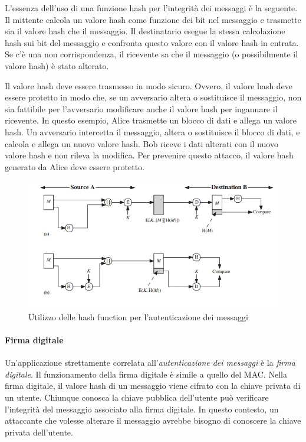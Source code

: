 \documentclass{article}
\theoremstyle{definition}
\begin{document}
L'essenza dell'uso di una funzione hash per l'integrità dei messaggi è la seguente. Il mittente calcola un valore hash come funzione dei bit nel messaggio e trasmette sia il valore hash che il messaggio. Il destinatario esegue la stessa calcolazione hash sui bit del messaggio e confronta questo valore con il valore hash in entrata. Se c'è una non corrispondenza, il ricevente sa che il messaggio (o possibilmente il valore hash) è stato alterato.

Il valore hash deve essere trasmesso in modo sicuro. Ovvero, il valore hash deve essere protetto in modo che, se un avversario altera o sostituisce il messaggio, non sia fattibile per l'avversario modificare anche il valore hash per ingannare il ricevente. In questo esempio, Alice trasmette un blocco di dati e allega un valore hash. Un avversario intercetta il messaggio, altera o sostituisce il blocco di dati, e calcola e allega un nuovo valore hash. Bob riceve i dati alterati con il nuovo valore hash e non rileva la modifica. Per prevenire questo attacco, il valore hash generato da Alice deve essere protetto.

\begin{figure}[H]
    \centering
    \includegraphics[width=\textwidth]{img/alice.jpg}
    \caption{Utilizzo delle hash function per l'autenticazione dei messaggi}
    \label{fig:itm}
\end{figure}

\paragraph{Firma digitale}
Un'applicazione strettamente correlata all'\textit{autenticazione dei messaggi} è la \textit{firma digitale}. Il funzionamento della firma digitale è simile a quello del MAC. Nella firma digitale, il valore hash di un messaggio viene cifrato con la chiave privata di un utente. Chiunque conosca la chiave pubblica dell'utente può verificare l'integrità del messaggio associato alla firma digitale. In questo contesto, un attaccante che volesse alterare il messaggio avrebbe bisogno di conoscere la chiave privata dell'utente.
\end{document}

